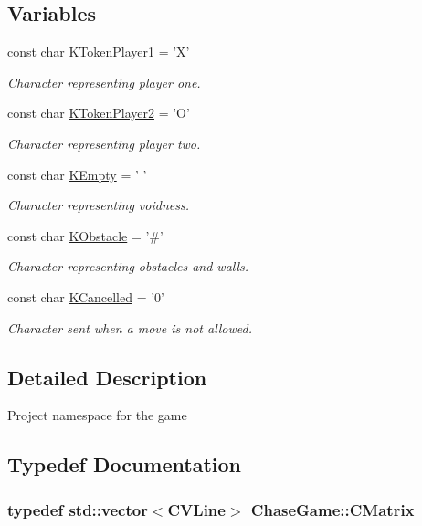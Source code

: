 \subsection*{Variables}
\begin{DoxyCompactItemize}
\item 
const char \hyperlink{namespace_chase_game_a8452e2d6de618e4ca7a9f76b082b52a4}{K\-Token\-Player1} = 'X'
\begin{DoxyCompactList}\small\item\em Character representing player one. \end{DoxyCompactList}\item 
const char \hyperlink{namespace_chase_game_ae27343407c21a8d6e3cf26b736bd5527}{K\-Token\-Player2} = 'O'
\begin{DoxyCompactList}\small\item\em Character representing player two. \end{DoxyCompactList}\item 
const char \hyperlink{namespace_chase_game_aa036d4de40188ba2e1aa36ab6cfaf1da}{K\-Empty} = ' '
\begin{DoxyCompactList}\small\item\em Character representing voidness. \end{DoxyCompactList}\item 
const char \hyperlink{namespace_chase_game_ad86181b2050b912dab9d69d2f0bea76e}{K\-Obstacle} = '\#'
\begin{DoxyCompactList}\small\item\em Character representing obstacles and walls. \end{DoxyCompactList}\item 
const char \hyperlink{namespace_chase_game_a12d6411bb9a72150acba6060bb1587e1}{K\-Cancelled} = '0'
\begin{DoxyCompactList}\small\item\em Character sent when a move is not allowed. \end{DoxyCompactList}\end{DoxyCompactItemize}


\subsection{Detailed Description}
Project namespace for the game 

\subsection{Typedef Documentation}
\hypertarget{namespace_chase_game_a469449f9237e59efce3982127366c550}{
\subsubsection[{C\-Matrix}]{\setlength{\rightskip}{0pt plus 5cm}typedef std\-::vector$<${\bf C\-V\-Line}$>$ {\bf Chase\-Game\-::\-C\-Matrix}}}\label{namespace_chase_game_a469449f9237e59efce3982127366c550}


